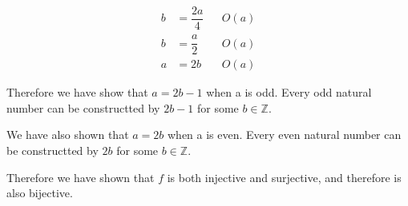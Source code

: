 \documentclass{article}
\begin{document}
\begin{exercise}{}{}
\begin{alist}
\begin{align*}
			b      & =\dfrac{2a}{4}              &  & O(a) \\
			b      & =\dfrac{a}{2}               &  & O(a) \\
			a      & =2b                         &  & O(a)
		\end{align*}
		\item Therefore we have show that $a=2b-1$ when a is odd. Every odd natural number can
		be constructted by $2b-1$ for some $b\in\mathbb{Z}$.
		\item We have also shown that $a=2b$ when a is even. Every even natural number can
		be constructted by $2b$ for some $b\in\mathbb{Z}$.
		\item Therefore we have shown that $f$ is both injective and surjective, and
		therefore is also bijective.
	\end{alist}
\end{exercise}{}{}
\end{document}
